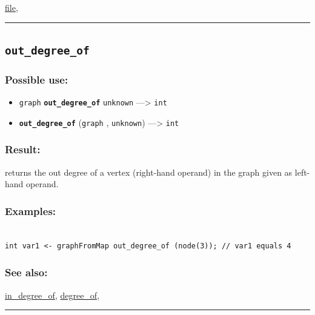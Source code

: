 \documentclass[]{book}
\providecommand{\tightlist}{%
  \setlength{\itemsep}{0pt}\setlength{\parskip}{0pt}}
\theoremstyle{definition}
\theoremstyle{definition}
\theoremstyle{definition}
\theoremstyle{remark}
\begin{document}
\href{operators-d-to-h.html\#file}{file},

\begin{center}\rule{0.5\linewidth}{\linethickness}\end{center}

\subsection{\texorpdfstring{\texttt{out\_degree\_of}}{out\_degree\_of}}\label{out_degree_of}

\subsubsection{Possible use:}\label{possible-use-388}

\begin{itemize}
\tightlist
\item
  \texttt{graph} \textbf{\texttt{out\_degree\_of}} \texttt{unknown}
  ---\textgreater{} \texttt{int}
\item
  \textbf{\texttt{out\_degree\_of}} (\texttt{graph} , \texttt{unknown})
  ---\textgreater{} \texttt{int}
\end{itemize}

\subsubsection{Result:}\label{result-374}

returns the out degree of a vertex (right-hand operand) in the graph
given as left-hand operand.

\subsubsection{Examples:}\label{examples-266}

\begin{verbatim}
 
int var1 <- graphFromMap out_degree_of (node(3)); // var1 equals 4
\end{verbatim}

\subsubsection{See also:}\label{see-also-154}

\href{operators-i-to-m.html\#in_degree_of}{in\_degree\_of},
\href{operators-d-to-h.html\#degree_of}{degree\_of},

\begin{center}\rule{0.5\linewidth}{\linethickness}\end{center}
\end{document}
